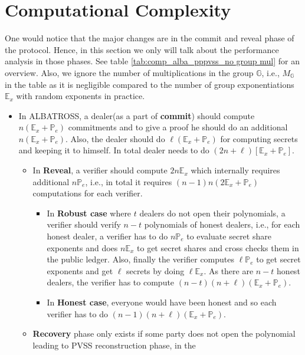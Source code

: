\section{Computational Complexity}

One would notice that the major changes are in the commit and reveal phase of the protocol. 
Hence, in this section we only will talk about the performance analysis in those 
phases. See table \ref{tab:comp_alba_pppvss_no group mul} for an overview. Also, we ignore the number of 
multiplications in the group $\mathbb{G}$, i.e., $M_{\mathbb{G}}$ in the table as it is negligible compared to 
the number of group exponentiations $\mathbb{E}_x$ with random exponents in practice. 
\begin{itemize}
    \item In ALBATROSS, a dealer(as a part of \textbf{commit}) should compute $n(\mathbb{E}_x+\mathbb{P}_e)$ commitments and to give a proof he should do an additional $n(\mathbb{E}_{x}+\mathbb{P}_e)$. Also, the dealer should do $\ell(\mathbb{E}_x+\mathbb{P}_e)$ for computing secrets and keeping it to himself. In total dealer needs to do $(2n+\ell)[\mathbb{E}_x+\mathbb{P}_e]$.
        \begin{itemize}
            \item In \textbf{Reveal}, a verifier should compute $2n\mathbb{E}_{x}$ which internally requires additional $n\mathbb{P}_e$, i.e., in total it requires $(n-1)n(2\mathbb{E}_{x}+\mathbb{P}_{e})$ computations for each verifier.
            \begin{itemize}
                \item In \textbf{Robust case} where $t$ dealers do not open their polynomials, a verifier should verify $n-t$ polynomials of honest dealers, i.e., for each honest dealer, a verifier has to do $n\mathbb{P}_e$ to evaluate secret share exponents and does $n\mathbb{E}_x$ to get secret shares and cross checks them in the public ledger. Also, finally the verifier computes $\ell\mathbb{P}_e$ to get secret exponents and get $\ell$ secrets by doing $\ell\mathbb{E}_x$. As there are $n-t$ honest dealers, the verifier has to compute $(n-t)(n+\ell)(\mathbb{E}_x+\mathbb{P}_e)$.
                \item  In \textbf{Honest case}, everyone would have been honest and so each verifier has to do $(n-1)(n+\ell)(\mathbb{E}_x+\mathbb{P}_e)$.
            \end{itemize}
            \item \textbf{Recovery} phase only exists if some party does not 
            open the polynomial leading to PVSS reconstruction phase, in the 

\end{itemize}
\end{itemize}
